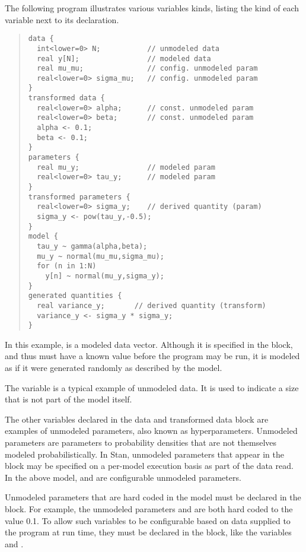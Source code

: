 The following program illustrates various variables kinds, listing the
kind of each variable next to its declaration.
%
\begin{quote}
\begin{Verbatim}[fontsize=\small]
data {
  int<lower=0> N;           // unmodeled data
  real y[N];                // modeled data
  real mu_mu;               // config. unmodeled param
  real<lower=0> sigma_mu;   // config. unmodeled param
}
transformed data {
  real<lower=0> alpha;      // const. unmodeled param
  real<lower=0> beta;       // const. unmodeled param
  alpha <- 0.1;       
  beta <- 0.1;
} 
parameters {
  real mu_y;                // modeled param
  real<lower=0> tau_y;      // modeled param
} 
transformed parameters {
  real<lower=0> sigma_y;    // derived quantity (param)
  sigma_y <- pow(tau_y,-0.5);
}
model {
  tau_y ~ gamma(alpha,beta);
  mu_y ~ normal(mu_mu,sigma_mu);
  for (n in 1:N)
    y[n] ~ normal(mu_y,sigma_y);
}
generated quantities {
  real variance_y;       // derived quantity (transform)
  variance_y <- sigma_y * sigma_y; 
}
\end{Verbatim}
\end{quote}
%
In this example,  is a modeled data vector.  Although it is
specified in the  block, and thus must have a known value
before the program may be run, it is modeled as if it were generated
randomly as described by the model.  

The variable  is a typical example of unmodeled data.  It is
used to indicate a size that is not part of the model itself.

The other variables declared in the data and transformed data block are
examples of unmodeled parameters, also known as hyperparameters.
Unmodeled parameters are parameters to probability densities that are
not themselves modeled probabilistically.  In Stan, unmodeled
parameters that appear in the  block may be specified on a
per-model execution basis as part of the data read.  In the above
model,  and  are configurable unmodeled
parameters.  

Unmodeled parameters that are hard coded in the model must be declared
in the  block.  For example, the unmodeled
parameters  and  are both hard coded to the
value 0.1.  To allow such variables to be configurable based on data
supplied to the program at run time, they must be declared in the
 block, like the variables  and
.

